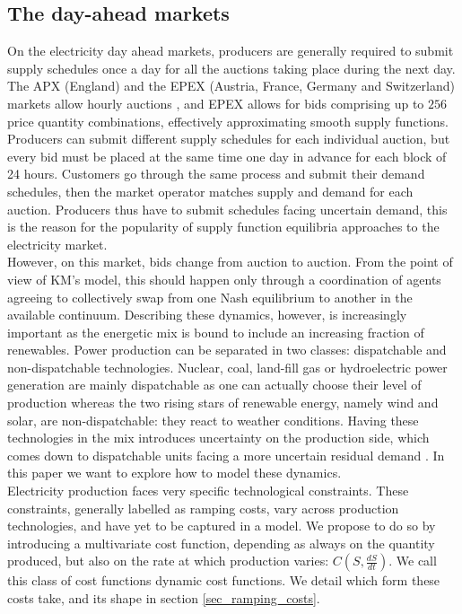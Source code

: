 \subsection{The day-ahead markets}

On the electricity day ahead markets, producers are generally required to submit supply schedules once a day for all the auctions taking place during the next day. The APX (England) and the EPEX (Austria, France, Germany and Switzerland) markets allow hourly auctions \cite{apx,epex}, and EPEX allows for bids comprising up to $256$ price quantity combinations, effectively approximating smooth supply functions. Producers can submit different supply schedules for each individual auction, but every bid must be placed at the same time one day in advance for each block of 24 hours. Customers go through the same process and submit their demand schedules, then the market operator matches supply and demand for each auction. Producers thus have to submit schedules facing uncertain demand, this is the reason for the popularity of supply function equilibria approaches to the electricity market.\\   

However, on this market, bids change from auction to auction. From the point of view of KM's model, this should happen only through a coordination of agents agreeing to collectively swap from one Nash equilibrium to another in the available continuum. Describing these dynamics, however, is increasingly important as the energetic mix is bound to include an increasing fraction of renewables. Power production can be separated in two classes: dispatchable and non-dispatchable technologies. Nuclear, coal, land-fill gas or hydroelectric power generation are mainly dispatchable as one can actually choose their level of production whereas the two rising stars of renewable energy, namely wind and solar, are non-dispatchable: they react to weather conditions. Having these technologies in the mix introduces uncertainty on the production side, which comes down to dispatchable units facing a more uncertain residual demand \cite{Boyle}. In this paper we want to explore how to model these dynamics. \\

Electricity production faces very specific technological constraints. These constraints, generally labelled as ramping costs, vary across production technologies, and have yet to be captured in a model. We propose to do so by introducing a multivariate cost function, depending as always on the quantity produced, but also on the rate at which production varies: $C(S,\frac{dS}{dt})$. We call this class of cost functions dynamic cost functions. We detail which form these costs take, and its shape in section \ref{sec_ramping_costs}.\\

